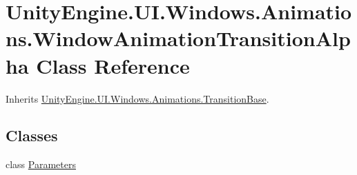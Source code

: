\hypertarget{class_unity_engine_1_1_u_i_1_1_windows_1_1_animations_1_1_window_animation_transition_alpha}{}\section{Unity\+Engine.\+U\+I.\+Windows.\+Animations.\+Window\+Animation\+Transition\+Alpha Class Reference}
\label{class_unity_engine_1_1_u_i_1_1_windows_1_1_animations_1_1_window_animation_transition_alpha}


Inherits \hyperlink{class_unity_engine_1_1_u_i_1_1_windows_1_1_animations_1_1_transition_base}{Unity\+Engine.\+U\+I.\+Windows.\+Animations.\+Transition\+Base}.

\subsection*{Classes}
\begin{DoxyCompactItemize}
\item 
class \hyperlink{class_unity_engine_1_1_u_i_1_1_windows_1_1_animations_1_1_window_animation_transition_alpha_1_1_parameters}{Parameters}
\end{DoxyCompactItemize}
